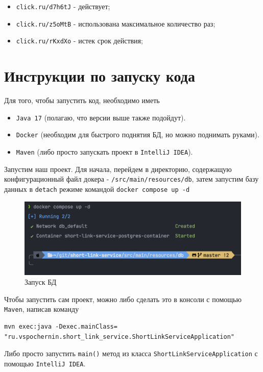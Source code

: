 \documentclass[a4paper, 14pt]{article}
\begin{document}
\begin{itemize}
	\item \texttt{click.ru/d7h6tJ} - действует;
	\item \texttt{click.ru/z5oMtB} - использована максимальное количество раз;
	\item \texttt{click.ru/rKxdXo} - истек срок действия;
\end{itemize}

\newpage
\section{Инструкции по запуску кода}

Для того, чтобы запустить код, необходимо иметь

\begin{itemize}
	\item \texttt{Java 17} (полагаю, что версии выше также подойдут).
	\item \texttt{Docker} (необходим для быстрого поднятия БД, но можно поднимать руками).
	\item \texttt{Maven} (либо просто запускать проект в \texttt{IntelliJ IDEA}).
\end{itemize}

Запустим наш проект. Для начала, перейдем в директорию, содержащую конфигурационный файл докера - \texttt{/src/main/resources/db}, затем запустим базу данных в \texttt{detach} режиме командой \texttt{docker compose up -d}

\begin{figure}[H]
	\centering
	\includegraphics[width=17cm]{resources/1.png}
	\caption{Запуск БД}
\end{figure}

Чтобы запустить сам проект, можно либо сделать это в консоли с помощью \texttt{Maven}, написав команду
\begin{verbatim}
mvn exec:java -Dexec.mainClass=
"ru.vspochernin.short_link_service.ShortLinkServiceApplication"
\end{verbatim}
Либо просто запустить \texttt{main()} метод из класса \texttt{ShortLinkServiceApplication} с помощью \texttt{IntelliJ IDEA}.
\end{document}
